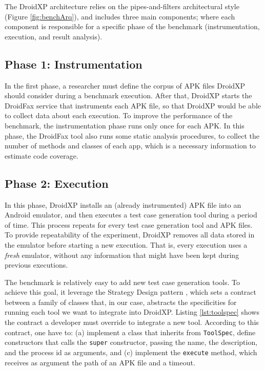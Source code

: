 The DroidXP architecture relies on the pipes-and-filters architectural style \cite{architecture-book} (Figure \ref{fig:benchArq}),
and includes three main components; where each component is responsible for a specific phase of the
benchmark (instrumentation, execution, and result analysis).

\subsection{Phase 1: Instrumentation}

In the first phase, a researcher must define the corpus of APK files DroidXP
should consider during a benchmark execution. After that, DroidXP starts the DroidFax service that instruments each APK file, so that DroidXP would be able to collect data about each execution. To improve the performance of the benchmark, the instrumentation phase runs only once for each APK. In this phase, the DroidFax tool also runs some static analysis procedures, to collect the number of methods and classes of each app, which is a necessary information to estimate code coverage.

\subsection{Phase 2: Execution}

In this phase, DroidXP installs an (already instrumented) APK file into
an Android emulator, and then executes a test case generation tool
during a period of time. This process repeats for every test case generation
tool and APK files. To provide repeatability of the experiment,
DroidXP removes all data stored in the emulator before starting
a new execution. That is, every execution uses a \emph{fresh} emulator,
without any information that might have been kept during
previous executions. 

The benchmark is relatively easy to add new test
case generation tools. To achieve this goal, it leverage the
Strategy Design pattern \cite{patterns-book}, which sets a contract between a family of classes that, in our case, abstracts the specificities for running each tool we want to integrate into DroidXP. Listing \ref{lst:toolspec} shows the contract a developer must override to integrate a new tool. According to this contract, one have to: (a) implement a class that inherits from \texttt{ToolSpec}, define constructors that calls the \texttt{super} constructor, passing the name, the description, and the process id as arguments, and (c) implement the \texttt{execute} method, which receives as argument the path of an APK file and a timeout. 


